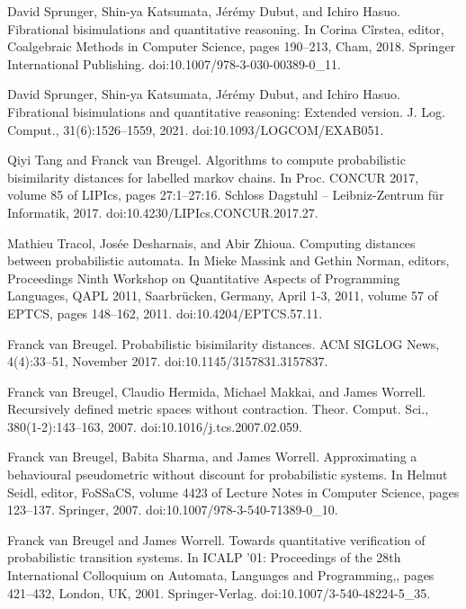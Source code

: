 \par\noindent  [51]  David Sprunger, Shin-ya Katsumata, Jérémy Dubut, and Ichiro Hasuo.  Fibrational bisimulations and quantitative reasoning.  In Corina Cîrstea, editor, Coalgebraic Methods in Computer Science, pages 190–213, Cham, 2018. Springer International Publishing.  doi:10.1007/978-3-030-00389-0\_11.  
 
\par\noindent  [52]  David Sprunger, Shin-ya Katsumata, Jérémy Dubut, and Ichiro Hasuo.  Fibrational bisimulations and quantitative reasoning: Extended version.  J. Log. Comput., 31(6):1526–1559, 2021.  doi:10.1093/LOGCOM/EXAB051.  
 
\par\noindent  [53]  Qiyi Tang and Franck van Breugel.  Algorithms to compute probabilistic bisimilarity distances for labelled markov chains.  In Proc. CONCUR 2017, volume 85 of LIPIcs, pages 27:1–27:16. Schloss Dagstuhl – Leibniz-Zentrum für Informatik, 2017.  doi:10.4230/LIPIcs.CONCUR.2017.27.  
 
\par\noindent  [54]  Mathieu Tracol, Josée Desharnais, and Abir Zhioua.  Computing distances between probabilistic automata.  In Mieke Massink and Gethin Norman, editors, Proceedings Ninth Workshop on Quantitative Aspects of Programming Languages, QAPL 2011, Saarbrücken, Germany, April 1-3, 2011, volume 57 of EPTCS, pages 148–162, 2011.  doi:10.4204/EPTCS.57.11.  
 
\par\noindent  [55]  Franck van Breugel.  Probabilistic bisimilarity distances.  ACM SIGLOG News, 4(4):33–51, November 2017.  doi:10.1145/3157831.3157837.  
 
\par\noindent  [56]  Franck van Breugel, Claudio Hermida, Michael Makkai, and James Worrell.  Recursively defined metric spaces without contraction.  Theor. Comput. Sci., 380(1-2):143–163, 2007.  doi:10.1016/j.tcs.2007.02.059.  
 
\par\noindent  [57]  Franck van Breugel, Babita Sharma, and James Worrell.  Approximating a behavioural pseudometric without discount for probabilistic systems.  In Helmut Seidl, editor, FoSSaCS, volume 4423 of Lecture Notes in Computer Science, pages 123–137. Springer, 2007.  doi:10.1007/978-3-540-71389-0\_10.  
 
\par\noindent  [58]  Franck van Breugel and James Worrell.  Towards quantitative verification of probabilistic transition systems.  In ICALP ’01: Proceedings of the 28th International Colloquium on Automata, Languages and Programming,, pages 421–432, London, UK, 2001. Springer-Verlag.  doi:10.1007/3-540-48224-5\_35.  
 
